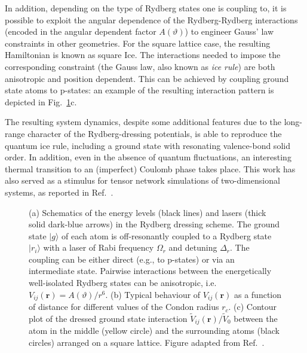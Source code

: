 \documentclass[epj,final]{svjour}
\begin{document}
In addition, depending on the type of Rydberg states one is coupling to, it is possible to exploit the angular dependence of the Rydberg-Rydberg interactions (encoded in the angular dependent factor $A(\vartheta)$) to engineer Gauss' law constraints in other geometries. For the square lattice case, the resulting Hamiltonian is known as square Ice. The interactions needed to impose the corresponding constraint (the Gauss law, also known as {\it ice rule}) are both anisotropic and position dependent. This can be achieved by coupling ground state atoms to p-states: an example of the resulting interaction pattern is depicted in Fig.~\ref{fig:Ryd_Ice}c.

The resulting system dynamics, despite some additional features due to the long-range character of the Rydberg-dressing potentials, is able to reproduce the quantum ice rule, including a ground state with resonating valence-bond solid order. In addition, even in the absence of quantum fluctuations, an interesting thermal transition to an (imperfect) Coulomb phase takes place. This work has also served as a stimulus for tensor network simulations of two-dimensional systems, as reported in Ref.~\cite{tschirsich2019phase}.

\begin{figure}
\caption{(a) Schematics of the energy levels (black lines) and lasers (thick solid dark-blue arrows) in the Rydberg dressing scheme. The ground state $|g\rangle$ of each atom is off-resonantly coupled to a Rydberg state $|r_i\rangle$ with a laser of Rabi frequency $\Omega_r$ and detuning $\Delta_r$. The coupling can be either direct (e.g., to p-states) or via an intermediate state. Pairwise interactions between the energetically well-isolated Rydberg states can be anisotropic, i.e. $V_{ij}(\mathbf{r})=A(\vartheta)/r^6$. (b) Typical behaviour of $V_{ij}(\mathbf{r})$ as a function of distance for different values of the Condon radius $r_c$. (c) Contour plot of the dressed ground state interaction $\tilde V_{ij}(\mathbf{r})/\tilde V_0$ between the atom in the middle (yellow circle) and the surrounding atoms (black circles) arranged on a square lattice. Figure adapted from Ref.~\cite{glaetzle2014quantum}. }
\label{fig:Ryd_Ice}
\end{figure} 
\end{document}
